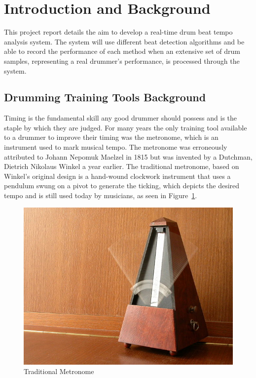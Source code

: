 \documentclass[a4paper, 11pt]{article}
\begin{document}
\maketitle{} \section{Introduction and Background}

This project report details the aim to develop a real-time drum beat tempo analysis system. The system will use different beat detection algorithms and be able to record the performance of each method when an extensive set of drum samples, representing a real drummer's performance, is processed through the system.

\subsection{Drumming Training Tools Background}
Timing is the fundamental skill any good drummer should possess and is the staple by which they are judged. For many years the only training tool available to a drummer to improve their timing was the metronome, which is an instrument used to mark musical tempo. The metronome was erroneously attributed to Johann Nepomuk Maelzel in 1815 but was invented by a Dutchman, Dietrich Nikolaus Winkel a year earlier. The traditional metronome, based on Winkel's original design is a hand-wound clockwork instrument that uses a pendulum swung on a pivot to generate the ticking, which depicts the desired tempo \cite{brit-metro} and is still used today by musicians, as seen in Figure~\ref{fig: TradMet}. \par

\begin{figure}[h]
	\centering
	\includegraphics[scale=0.25]{TradMet}
	\caption{Traditional Metronome \cite{metro}}
	\label{fig: TradMet}
\end{figure}
\end{document}
